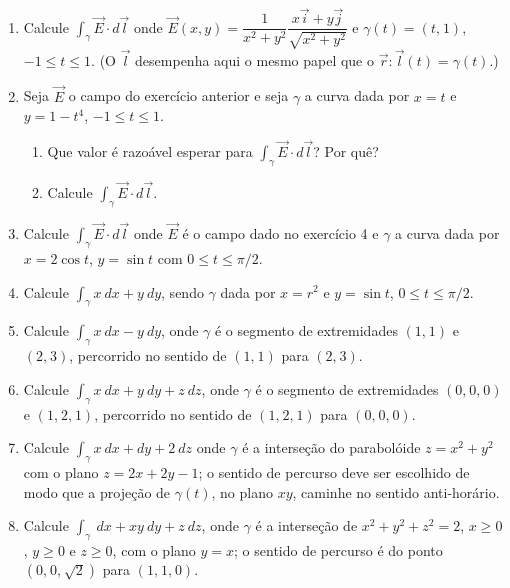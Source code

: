 \documentclass[11pt,a4paper]{article}
\begin{document}
\begin{enumerate}
\begin{enumerate}
\end{enumerate}

\item Calcule $\displaystyle\int_\gamma \vec{E} \cdot d\vec{l}$ onde $\vec{E}(x,y) = \dfrac{1}{x^2 + y^2} \dfrac{x \vec{i} + y \vec{j}}{\sqrt{x^2 + y^2}}$ e $\gamma (t) = (t \textrm{,}\ 1)$, $-1 \leq t \leq 1$. (O $\vec{l}$ desempenha aqui o mesmo papel que o $\vec{r}:\vec{l}(t) = \gamma (t)$.)

\item Seja $\vec{E}$ o campo do exercício anterior e seja $\gamma$ a curva dada por $x = t$ e $y = 1 - t^4$,  $-1 \leq t \leq 1$.
\begin{enumerate}
\item Que valor é razoável esperar para $\displaystyle\int_\gamma \vec{E} \cdot d\vec{l}$? Por quê?
\item Calcule $\displaystyle\int_\gamma \vec{E} \cdot d\vec{l}$.
\end{enumerate}

\item Calcule $\displaystyle\int_\gamma \vec{E} \cdot d\vec{l}$ onde $\vec{E}$ é o campo dado no exercício 4 e $\gamma$ a curva dada por $x = 2\cos t$, $y = \sin t$ com $0 \leq t \leq \pi/2$.

\item Calcule $\displaystyle\int_\gamma x \ dx + y \ dy$, sendo $\gamma$ dada por $x = r^2$ e $y = \sin t$, $0 \leq t \leq \pi/2$.

\item Calcule $\displaystyle\int_\gamma x \ dx - y \ dy$, onde $\gamma$ é o segmento de extremidades $(1 \textrm{,}\ 1)$ e $(2 \textrm{,}\ 3)$, percorrido no sentido de $(1 \textrm{,}\ 1)$ para $(2 \textrm{,}\ 3)$.

\item Calcule $\displaystyle\int_\gamma x \ dx + y \ dy + z \ dz$, onde $\gamma$ é o segmento de extremidades $(0 \textrm{,}\ 0 \textrm{,}\ 0)$ e $(1 \textrm{,}\ 2 \textrm{,}\ 1)$, percorrido no sentido de $(1 \textrm{,}\ 2 \textrm{,}\ 1)$ para $(0 \textrm{,}\ 0 \textrm{,}\ 0)$.

\item Calcule $\displaystyle\int_\gamma x \ dx + dy + 2 \ dz$ onde $\gamma$ é a interseção do parabolóide $z = x^2 + y^2$ com o plano $z = 2x + 2y - 1$; o sentido de percurso deve ser escolhido de modo que a projeção de $\gamma (t)$, no plano $xy$, caminhe no sentido anti-horário.

\item Calcule $\displaystyle\int_\gamma \ dx + xy \ dy + z \ dz$, onde $\gamma$ é a interseção de $x^2 + y^2 + z^2 = 2$, $x \geq 0$, $y \geq 0$ e $z \geq 0$, com o plano $y = x$; o sentido de percurso é do ponto $(0 \textrm{,}\ 0 \textrm{,}\ \sqrt{2})$ para $(1 \textrm{,}\ 1 \textrm{,}\ 0)$.


\end{enumerate}
\end{document}
